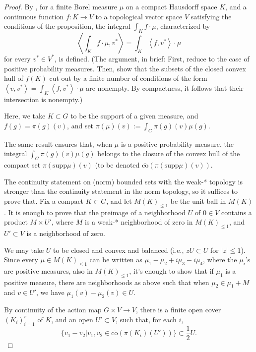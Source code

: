 \begin{proof}
By \cite[Theorem 3.27]{Rudin}, for a finite Borel measure $\mu$ on a compact Hausdorff space $K$, and a continuous function $f:K\to V$ to a topological vector space $V$ satisfying the conditions of the proposition, the integral $\int_K f \cdot \mu$, characterized by 
$$ \left< \int_K f \cdot \mu, v^*\right> = \int_K \left< f , v^*\right> \cdot \mu$$ for every $v^*\in V^*$, is defined. (The argument, in brief: First, reduce to the case of positive probability measures. Then, show that the subsets of the closed convex hull of $f(K)$ cut out by a finite number of conditions of the form $\left< v, v^*\right> = \int_K \left< f , v^*\right> \cdot \mu$ are nonempty. By compactness, it follows that their intersection is nonempty.) 

Here, we take $K \subset G$ to be the support of a given measure, and $f(g) = \pi(g)(v)$, and set $\pi(\mu)(v):= \int_{G} \pi(g)(v) \mu(g)$.

The same result ensures that, when $\mu$ is a positive probability measure, the integral $\int_{G} \pi(g)(v) \mu(g)$ belongs to the closure of the convex hull of the compact set $\pi(\text{supp} \mu)(v)$ (to be denoted $\overline{\text{co}} \left( \pi(\text{supp} \mu)(v) \right)$.

The continuity statement on (norm) bounded sets with the weak-* topology is stronger than the continuity statement in the norm topology, so it suffices to prove that. Fix a compact $K\subset G$, and let $M(K)_{\le 1}$ be the unit ball in $M(K)$. It is enough to prove that the preimage of a neighborhood $U$ of $0\in V$ contains a product $M \times U'$, where $M$ is a weak-* neighborhood of zero in $M(K)_{\le 1}$, and $U'\subset V$ is a neighborhood of zero.

We may take $U$ to be closed and convex and balanced (i.e., $zU\subset U$ for $|z|\le 1$). 
Since every $\mu \in M(K)_{\le 1}$ can be written as $\mu_1 - \mu_2 +i\mu_3-i\mu_4$, where the $\mu_i$'s are positive measures, also in $M(K)_{\le 1}$, it's enough to show that if $\mu_1$ is a positive measure, there are neighborhoods as above such that when $\mu_2 \in \mu_1+M$ and $v\in U'$, we have $\mu_1(v)-\mu_2(v)\in U$. 

By continuity of the action map $G\times V\to V$, there is a finite open cover $(K_i)_{i=1}^r$ of $K$, and an open $U'\subset V$, such that, for each $i$, 
$$ \{ v_1- v_2| v_1, v_2 \in \overline{\text{co}}(\pi(K_i)(U'))\} \subset \frac{1}{2} U.$$


\end{proof}
